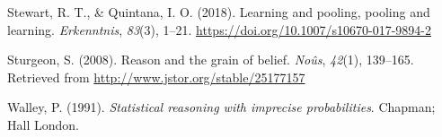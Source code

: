 \documentclass[
  10pt,
  dvipsnames,enabledeprecatedfontcommands]{scrartcl}
\newlength{\cslhangindent}
\newlength{\cslentryspacingunit} %
\newenvironment{CSLReferences}[2] %
 {%
  \setlength{\parindent}{0pt}
  \ifodd #1
  \let\oldpar\par
  \def\par{\hangindent=\cslhangindent\oldpar}
  \fi
  \setlength{\parskip}{#2\cslentryspacingunit}
 }%
 {}
\begin{document}
\begin{CSLReferences}{1}{0}
\leavevmode{}%
Stewart, R. T., \& Quintana, I. O. (2018). Learning and pooling, pooling
and learning. \emph{Erkenntnis}, \emph{83}(3), 1--21.
\url{https://doi.org/10.1007/s10670-017-9894-2}

\leavevmode{}%
Sturgeon, S. (2008). Reason and the grain of belief. \emph{No{û}s},
\emph{42}(1), 139--165. Retrieved from
\url{http://www.jstor.org/stable/25177157}

\leavevmode{}%
Walley, P. (1991). \emph{Statistical reasoning with imprecise
probabilities}. Chapman; Hall London.

\end{CSLReferences}
\end{document}
